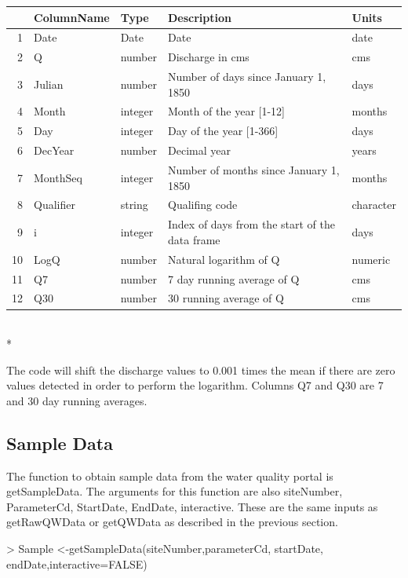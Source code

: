 \documentclass[a4paper,11pt]{article}
\begin{document}
\begin{tabular}{rllll}
  \hline
 & ColumnName & Type & Description & Units \\ 
  \hline
1 & Date & Date & Date & date \\ 
  2 & Q & number & Discharge in cms & cms \\ 
  3 & Julian & number & Number of days since January 1, 1850 & days \\ 
  4 & Month & integer & Month of the year [1-12] & months \\ 
  5 & Day & integer & Day of the year [1-366] & days \\ 
  6 & DecYear & number & Decimal year & years \\ 
  7 & MonthSeq & integer & Number of months since January 1, 1850 & months \\ 
  8 & Qualifier & string & Qualifing code & character \\ 
  9 & i & integer & Index of days from the start of the data frame & days \\ 
  10 & LogQ & number & Natural logarithm of Q & numeric \\ 
  11 & Q7 & number & 7 day running average of Q & cms \\ 
  12 & Q30 & number & 30 running average of Q & cms \\ 
   \hline
\end{tabular}\\*

The code will shift the discharge values to 0.001 times the mean if there are zero values detected in order to perform the logarithm. Columns Q7 and Q30 are 7 and 30 day running averages. 

\subsection{Sample Data}
The function to obtain sample data from the water quality portal is getSampleData. The arguments for this function are also siteNumber, ParameterCd, StartDate, EndDate, interactive. These are the same inputs as getRawQWData or getQWData as described in the previous section.

\begin{Schunk}
\begin{Sinput}
> Sample <-getSampleData(siteNumber,parameterCd,
       startDate, endDate,interactive=FALSE)
\end{Sinput}
\end{Schunk}
\end{document}
